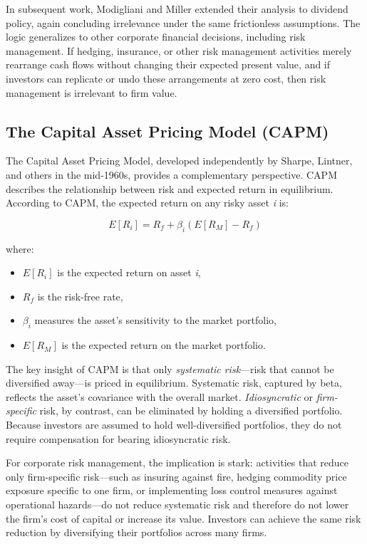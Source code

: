 \documentclass[11pt,openany]{book}
\providecommand{\tightlist}{\setlength{\itemsep}{0pt}\setlength{\parskip}{0pt}}
\begin{document}
In subsequent work, Modigliani and Miller extended their analysis to dividend policy, again concluding irrelevance under the same frictionless assumptions. The logic generalizes to other corporate financial decisions, including risk management. If hedging, insurance, or other risk management activities merely rearrange cash flows without changing their expected present value, and if investors can replicate or undo these arrangements at zero cost, then risk management is irrelevant to firm value.

\subsection{The Capital Asset Pricing Model (CAPM)}\label{the-capital-asset-pricing-model-capm}

The Capital Asset Pricing Model, developed independently by Sharpe, Lintner, and others in the mid-1960s, provides a complementary perspective. CAPM describes the relationship between risk and expected return in equilibrium. According to CAPM, the expected return on any risky asset \emph{i} is:

\[
E[R_i] = R_f + \beta_i \left( E[R_M] - R_f \right)
\]

where:

\begin{itemize}
\tightlist
\item
  \(E[R_i]\) is the expected return on asset \emph{i},
\item
  \(R_f\) is the risk-free rate,
\item
  \(\beta_i\) measures the asset's sensitivity to the market portfolio,
\item
  \(E[R_M]\) is the expected return on the market portfolio.
\end{itemize}

The key insight of CAPM is that only \emph{systematic risk}---risk that cannot be diversified away---is priced in equilibrium. Systematic risk, captured by beta, reflects the asset's covariance with the overall market. \emph{Idiosyncratic} or \emph{firm-specific} risk, by contrast, can be eliminated by holding a diversified portfolio. Because investors are assumed to hold well-diversified portfolios, they do not require compensation for bearing idiosyncratic risk.

For corporate risk management, the implication is stark: activities that reduce only firm-specific risk---such as insuring against fire, hedging commodity price exposure specific to one firm, or implementing loss control measures against operational hazards---do not reduce systematic risk and therefore do not lower the firm's cost of capital or increase its value. Investors can achieve the same risk reduction by diversifying their portfolios across many firms.
\end{document}
